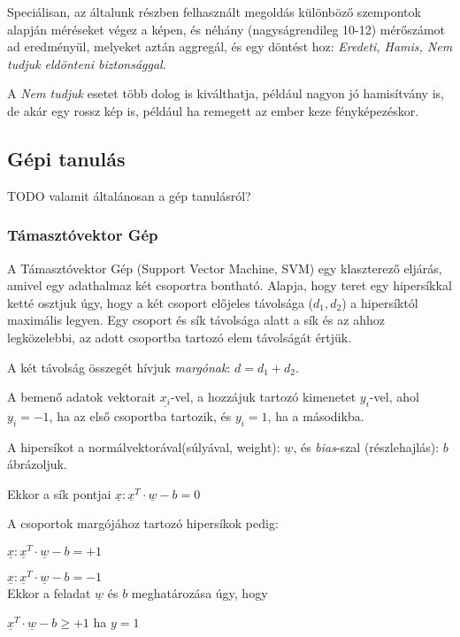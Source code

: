 Speciálisan, az általunk részben felhasznált megoldás különböző szempontok alapján méréseket
végez a képen, és néhány (nagyságrendileg 10-12) mérőszámot ad eredményül, melyeket aztán
aggregál, és egy döntést hoz: \textit{Eredeti, Hamis, Nem tudjuk eldönteni biztonsággal}.

A \textit{Nem tudjuk} esetet több dolog is kiválthatja, például nagyon jó hamisítvány is,
de akár egy rossz kép is, például ha remegett az ember keze fényképezéskor.

\subsection{Gépi tanulás}

TODO valamit általánosan a gép tanulásról?

\subsubsection{Támasztóvektor Gép}

A Támasztóvektor Gép (Support Vector Machine, SVM) egy klaszterező eljárás, amivel egy adathalmaz két 
csoportra bontható. Alapja, hogy teret egy hipersíkkal ketté osztjuk úgy, hogy a két csoport előjeles 
távolsága ($ d_1, d_2 $) a hipersíktól maximális legyen. 
Egy csoport és sík távolsága alatt a sík és az ahhoz legközelebbi, az adott csoportba tartozó elem távolságát értjük. 


A két távolság összegét hívjuk \textit{margónak}: $ d = d_1 + d_2 $.

A bemenő adatok vektorait $ \underline{x_i} $-vel, a hozzájuk tartozó kimenetet
$ y_i $-vel, ahol $ y_i=-1 $, ha az első csoportba tartozik, és $ y_i=1 $, ha a másodikba.

A hipersíkot a normálvektorával(súlyával, weight): $ \underline{w} $, és \textit{bias}-szal 
(részlehajlás): $ b $ ábrázoljuk.


Ekkor a sík pontjai $ \underline{x}: \underline{x}^T \cdot \underline{w} - b = 0 $

A csoportok margójához tartozó hipersíkok pedig:

$ \underline{x}: \underline{x}^T \cdot \underline{w} - b = +1 $

$ \underline{x}: \underline{x}^T \cdot \underline{w} - b = -1 $
\\
Ekkor a feladat $ \underline{w} $ és $ b $ meghatározása úgy, hogy 

$ \underline{x}^T \cdot \underline{w} - b \geq +1 $ ha $  y=1 $

